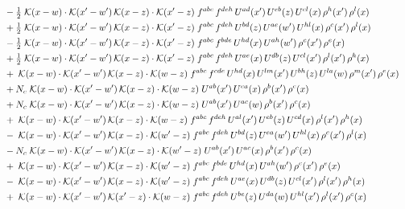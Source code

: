 \documentclass[9pt]{article}
\begin{document}
\begin{align}
&\quad -\tfrac{1}{2}\;\mathcal{K}(x-w)\cdot\mathcal{K}(x'-w')\,\mathcal{K}(x-z)\cdot\mathcal{K}(x'-z)\;f^{abc}\,f^{deh}\,U^{ad}(x')\,U^{eb}(z)\,U^{cl}(x)\,\rho^{h}(x')\,\rho^{l}(x)\notag\\
&\quad +\tfrac{1}{2}\;\mathcal{K}(x-w)\cdot\mathcal{K}(x'-w')\,\mathcal{K}(x-z)\cdot\mathcal{K}(x'-z)\;f^{abc}\,f^{deh}\,U^{bd}(z)\,U^{ae}(w')\,U^{hl}(x)\,\rho^{c}(x')\,\rho^{l}(x)\notag\\
&\quad -\tfrac{1}{2}\;\mathcal{K}(x-w)\cdot\mathcal{K}(x'-w')\,\mathcal{K}(x-z)\cdot\mathcal{K}(x'-z)\;f^{abc}\,f^{bde}\,U^{hd}(x)\,U^{ah}(w')\,\rho^{c}(x')\,\rho^{e}(x)\notag\\
&\quad +\tfrac{1}{2}\;\mathcal{K}(x-w)\cdot\mathcal{K}(x'-w')\,\mathcal{K}(x-z)\cdot\mathcal{K}(x'-z)\;f^{abc}\,f^{deh}\,U^{ae}(x)\,U^{db}(z)\,U^{cl}(x')\,\rho^{l}(x')\,\rho^{h}(x)\notag\\
&\quad +\;\mathcal{K}(x-w)\cdot\mathcal{K}(x'-w')\,\mathcal{K}(x-z)\cdot\mathcal{K}(w-z)\;f^{abc}\,f^{cde}\,U^{hd}(x)\,U^{lm}(x')\,U^{bh}(z)\,U^{la}(w)\,\rho^{m}(x')\,\rho^{e}(x)\notag\\
&\quad +N_c\;\mathcal{K}(x-w)\cdot\mathcal{K}(x'-w')\,\mathcal{K}(x-z)\cdot\mathcal{K}(w-z)\;U^{ab}(x')\,U^{ca}(x)\,\rho^{b}(x')\,\rho^{c}(x)\notag\\
&\quad +N_c\;\mathcal{K}(x-w)\cdot\mathcal{K}(x'-w')\,\mathcal{K}(x-z)\cdot\mathcal{K}(w-z)\;U^{ab}(x')\,U^{ac}(w)\,\rho^{b}(x')\,\rho^{c}(x)\notag\\
&\quad +\;\mathcal{K}(x-w)\cdot\mathcal{K}(x'-w')\,\mathcal{K}(x-z)\cdot\mathcal{K}(w-z)\;f^{abc}\,f^{deh}\,U^{al}(x')\,U^{eb}(z)\,U^{cd}(x)\,\rho^{l}(x')\,\rho^{h}(x)\notag\\
&\quad -\;\mathcal{K}(x-w)\cdot\mathcal{K}(x'-w')\,\mathcal{K}(x-z)\cdot\mathcal{K}(w'-z)\;f^{abc}\,f^{deh}\,U^{bd}(z)\,U^{ea}(w')\,U^{hl}(x)\,\rho^{c}(x')\,\rho^{l}(x)\notag\\
&\quad -N_c\;\mathcal{K}(x-w)\cdot\mathcal{K}(x'-w')\,\mathcal{K}(x-z)\cdot\mathcal{K}(w'-z)\;U^{ab}(x')\,U^{ac}(x)\,\rho^{b}(x')\,\rho^{c}(x)\notag\\
&\quad +\;\mathcal{K}(x-w)\cdot\mathcal{K}(x'-w')\,\mathcal{K}(x-z)\cdot\mathcal{K}(w'-z)\;f^{abc}\,f^{bde}\,U^{hd}(x)\,U^{ah}(w')\,\rho^{c}(x')\,\rho^{e}(x)\notag\\
&\quad -\;\mathcal{K}(x-w)\cdot\mathcal{K}(x'-w')\,\mathcal{K}(x-z)\cdot\mathcal{K}(w'-z)\;f^{abc}\,f^{deh}\,U^{ae}(x)\,U^{db}(z)\,U^{cl}(x')\,\rho^{l}(x')\,\rho^{h}(x)\notag\\
&\quad +\;\mathcal{K}(x-w)\cdot\mathcal{K}(x'-w')\,\mathcal{K}(x'-z)\cdot\mathcal{K}(w-z)\;f^{abc}\,f^{deh}\,U^{be}(z)\,U^{da}(w)\,U^{hl}(x')\,\rho^{l}(x')\,\rho^{c}(x)\notag\\

\end{align}
\end{document}
